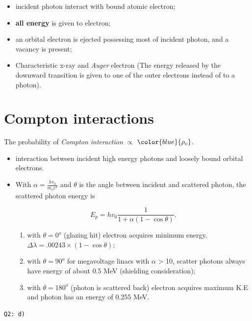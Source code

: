 \documentclass[]{book}
\providecommand{\tightlist}{%
  \setlength{\itemsep}{0pt}\setlength{\parskip}{0pt}}
\theoremstyle{definition}
\theoremstyle{definition}
\theoremstyle{definition}
\theoremstyle{remark}
\begin{document}
\begin{itemize}
\tightlist
\item
  incident photon interact with bound atomic electron;
\item
  \textbf{all energy} is given to electron;
\item
  an orbital electron is ejected possessing most of incident photon, and
  a vacancy is present;
\item
  Characteristic x-ray and \emph{Auger} electron (The energy released by
  the downward transition is given to one of the outer electrons instead
  of to a photon).
\end{itemize}

\section{Compton interactions}\label{compton}

The probability of \emph{Compton interaction} \(\propto\)
\(\color{blue} {\rho_e}\).

\begin{itemize}
\tightlist
\item
  interaction between incident high energy photons and loosely bound
  orbital electrons.
\item
  With \(\alpha = \frac{hv_0}{m_ec^2}\) and \(\theta\) is the angle
  between incident and scattered photon, the scattered photon energy is

  \begin{equation*}
    E_p = hv_0\frac{1}{1+\alpha(1-\cos\theta)}.
  \end{equation*}

  \begin{enumerate}
  \def\labelenumi{\alph{enumi}.}
  \tightlist
  \item
    with \(\theta = 0^o\) (glazing hit) electron acquires minimum
    energy, \(\Delta\lambda = .00243\times(1-\cos\theta)\);
  \item
    with \(\theta = 90^o\) for megavoltage linacs with \(\alpha\)
    \textgreater{} 10, scatter photons always have energy of about 0.5
    MeV (shielding consideration);
  \item
    with \(\theta = 180^o\) (photon is scattered back) electron acquires
    maximum K.E and photon has an energy of 0.255 MeV.
  \end{enumerate}
\end{itemize}

\texttt{Q2:\ d)}
\end{document}
